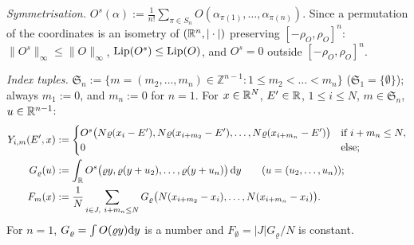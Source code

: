\noindent\emph{Symmetrisation.} $O^{s}(\alpha):=\frac1{n!}\sum_{\pi\in S_n}O(\alpha_{\pi(1)},\dots,\alpha_{\pi(n)})$. Since a permutation of the coordinates is an isometry of $(\mathbb{R}^n,|\cdot|)$ preserving $[-\rho_O,\rho_O]^n$: $\|O^s\|_\infty\le\|O\|_\infty$, $\operatorname{Lip}(O^s)\le\operatorname{Lip}(O)$, and $O^s=0$ outside $[-\rho_O,\rho_O]^n$.

\noindent\emph{Index tuples.} $\mathfrak S_n:=\{m=(m_2,\dots,m_n)\in\mathbb Z^{n-1}:1\le m_2<\dots<m_n\}$ ($\mathfrak S_1=\{\emptyset\}$); always $m_1:=0$, and $m_n:=0$ for $n=1$. For $x\in\mathbb{R}^N$, $E'\in\mathbb{R}$, $1\le i\le N$, $m\in\mathfrak S_n$, $u\in\mathbb{R}^{n-1}$:
\begin{align*}
Y_{i,m}(E',x)&:=\begin{cases}O^{s}\big(N\varrho(x_i-E'),N\varrho(x_{i+m_2}-E'),\dots,N\varrho(x_{i+m_n}-E')\big)&\text{if }i+m_n\le N,\\ 0&\text{else;}\end{cases}\\
G_\varrho(u)&:=\int_{\mathbb{R}} O^{s}\big(\varrho y,\varrho(y+u_2),\dots,\varrho(y+u_n)\big)\,\mathrm{d} y\qquad(u=(u_2,\dots,u_n));\\
F_m(x)&:=\frac1N\sum_{i\in J,\ i+m_n\le N}G_\varrho\big(N(x_{i+m_2}-x_i),\dots,N(x_{i+m_n}-x_i)\big).
\end{align*}
For $n=1$, $G_\varrho=\int O(\varrho y)\mathrm{d} y$ is a number and $F_\emptyset=|J|G_\varrho/N$ is constant.

